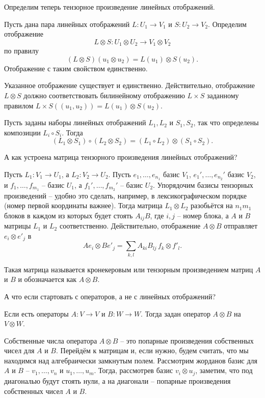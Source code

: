 Определим теперь тензорное произведение линейных отображений.

\dfn Пусть дана пара линейных отображений $L \colon U_1 \to V_1$ и $S\colon U_2 \to V_2 $. Определим отображение $$L\otimes S \colon U_1\otimes U_2 \to V_1\otimes V_2$$ по  правилу $$(L \otimes S) (u_1\otimes  u_2) = L(u_1)\otimes S(u_2).$$
Отображение с таким свойством единственно.
\edfn

\rm Указанное отображение существует и единственно. Действительно,  отображение $L\otimes S$ должно соответствовать билинейному отображению $L\times S$ заданному правилом $L\times S ((u_1,u_2)) = L(u_1)\otimes S(u_2)$. 
\erm

\rm Пусть заданы наборы линейных отображений $L_1, L_2$ и $S_1, S_2$, так что определены композиции $L_i\circ S_i$. Тогда
$$(L_1\otimes S_1) \circ (L_2 \otimes S_2)=(L_1\circ L_2)\otimes (S_1\circ S_2).$$
\erm 

А как устроена матрица тензорного произведения линейных отображений?


\lm Пусть $L_1 \colon V_1 \to U_1$, а $L_2 \colon V_2 \to U_2$. Пусть $e_1,\dots, e_{n_1}$ базис $V_1$,  $e_1',\dots, e_{n_2}'$ базис $V_2$,  и $f_1,\dots, f_{m_1}$ -- базис $U_1$, а $f_1',\dots, f_{m_2}'$ -- базис $U_2$. 
Упорядочим базисы тензорных произведений -- удобно это сделать, например, в лексикографическом порядке (номер первой координаты важнее).
Тогда матрица  $L_1\otimes L_2$  разобьётся на $n_1m_1$ блоков в каждом из которых будет стоять $ A_{ij} B$, где $i,j$ -- номер блока, а $A$ и $B$ матрицы $L_1$ и $L_2$ соответственно.
\proof Действительно, отображение $A\otimes B$ отправляет $e_i\otimes e'_j$ в 
$$Ae_i \otimes Be'_j = \sum_{k,l} A_{ki}B_{lj} \, f_k\otimes f'_l.$$
\endproof
\elm

\dfn Такая матрица называется кронекеровым или тензорным произведением матриц $A$ и $B$ и обозначается как $A\otimes B$.
\edfn

А что если стартовать с операторов, а не с линейных отображений?

\rm Если есть операторы $A\colon V \to V$ и $B \colon W \to W$. Тогда задан оператор $A\otimes B$ на $V\otimes W$.
\erm

\lm Собственные числа оператора $A\otimes B$  -- это попарные произведения собственных чисел для $A$ и $B$. 
\proof Перейдём к матрицам и, если нужно, будем считать, что мы находимся над алгебраически замкнутым полем. Рассмотрим жорданов базис для $A$ и $B$ -- $v_1,\dots,v_n$ и $u_1,\dots, u_m$. Тогда, рассмотрев базис $v_i\otimes u_j$, заметим, что под диагональю будут стоять нули, а на диагонали -- попарные произведения собственных чисел $A$ и $B$.
\endproof
\elm



